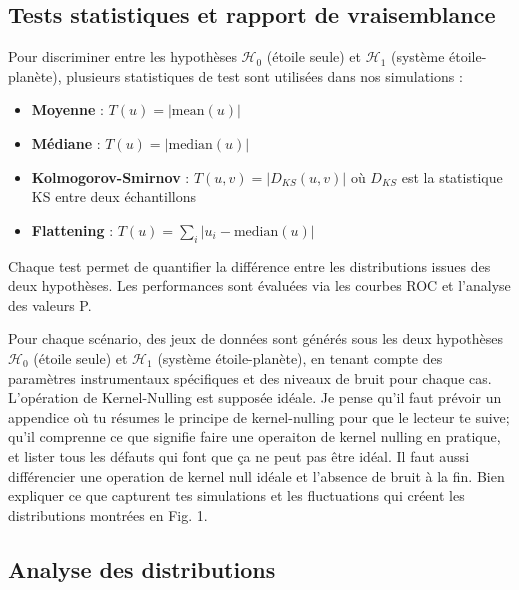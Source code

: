 \documentclass{article}
\newcommand{\dm}[1]{{\color{mulberry} #1}}
\begin{document}
\subsection{Tests statistiques et rapport de vraisemblance}

Pour discriminer entre les hypothèses $\mathcal{H}_0$ (étoile seule) et $\mathcal{H}_1$ (système étoile-planète), plusieurs statistiques de test sont utilisées dans nos simulations :

\begin{itemize}
    \item \textbf{Moyenne} : $T(u) = |\mathrm{mean}(u)|$
    \item \textbf{Médiane} : $T(u) = |\mathrm{median}(u)|$
    \item \textbf{Kolmogorov-Smirnov} : $T(u, v) = |D_{KS}(u, v)|$ où $D_{KS}$ est la statistique KS entre deux échantillons
    \item \textbf{Flattening} : $T(u) = \sum_i |u_i - \mathrm{median}(u)|$
\end{itemize}

Chaque test permet de quantifier la différence entre les distributions issues des deux hypothèses. Les performances sont évaluées via les courbes ROC et l'analyse des valeurs P.

Pour chaque scénario, des jeux de données sont générés sous les deux hypothèses $\mathcal{H}_0$ (étoile seule) et $\mathcal{H}_1$ (système étoile-planète), en tenant compte des paramètres instrumentaux spécifiques et des niveaux de bruit pour chaque cas. L'opération de Kernel-Nulling est supposée idéale.\dm{Je pense qu'il faut prévoir un appendice où tu résumes le principe de kernel-nulling pour que le lecteur te suive; qu'il comprenne ce que signifie faire une operaiton de kernel nulling en pratique, et lister tous les défauts qui font que ça ne peut pas être idéal. Il faut aussi différencier une operation de kernel null idéale et l'absence de bruit à la fin. Bien expliquer ce que capturent tes simulations et les fluctuations qui créent les distributions montrées en Fig. 1.}



\subsection{Analyse des distributions}  \label{sec:distribution_analysis}
\end{document}
